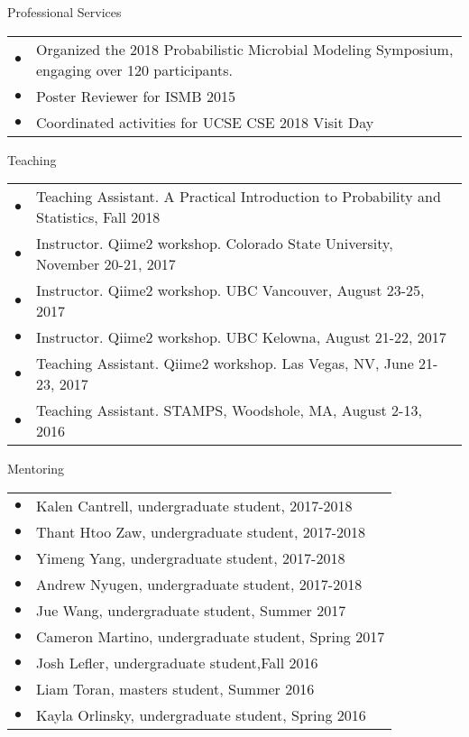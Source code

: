 \documentclass{resume} %
\begin{document}
\begin{rSection}{Professional Services}
  \begin{tabular}{ll}
    $\bullet$ & Organized the 2018 Probabilistic Microbial Modeling Symposium, engaging over 120 participants.\\
    $\bullet$ & Poster Reviewer for ISMB 2015\\
    $\bullet$ & Coordinated activities for UCSE CSE 2018 Visit Day\\
  \end{tabular}
\end{rSection}

\begin{rSection}{Teaching}
  \begin{tabular}{ll}
    $\bullet$ & Teaching Assistant. A Practical Introduction to Probability and Statistics, Fall 2018 \\
    $\bullet$ & Instructor. Qiime2 workshop. Colorado State University, November 20-21, 2017 \\
    $\bullet$ & Instructor. Qiime2 workshop. UBC Vancouver, August 23-25, 2017 \\
    $\bullet$ & Instructor. Qiime2 workshop. UBC Kelowna, August 21-22, 2017 \\
    $\bullet$ & Teaching Assistant. Qiime2 workshop. Las Vegas, NV, June 21-23, 2017 \\
    $\bullet$ & Teaching Assistant. STAMPS, Woodshole, MA, August 2-13, 2016 \\
  \end{tabular}
\end{rSection}\newpage
\begin{rSection}{Mentoring}
  \begin{tabular}{ll}
    $\bullet$  &   Kalen Cantrell, undergraduate student, 2017-2018 \\
    $\bullet$  &   Thant Htoo Zaw, undergraduate student, 2017-2018 \\
    $\bullet$  &   Yimeng Yang, undergraduate student, 2017-2018 \\
    $\bullet$  &   Andrew Nyugen, undergraduate student, 2017-2018 \\
    $\bullet$  &   Jue Wang, undergraduate student, Summer 2017 \\
    $\bullet$  &   Cameron Martino, undergraduate student, Spring 2017 \\
    $\bullet$  &   Josh Lefler, undergraduate student,Fall 2016 \\
    $\bullet$  &   Liam Toran, masters student, Summer 2016 \\
    $\bullet$  &   Kayla Orlinsky, undergraduate student, Spring 2016 \\
  \end{tabular}
\end{rSection}
\end{document}
